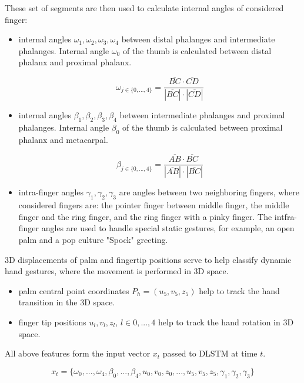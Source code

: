 These set of segments are then used to calculate internal angles of considered finger:
\begin{itemize}
    \item internal angles $\omega_1, \omega_2, \omega_3, \omega_4$ between distal phalanges and intermediate phalanges. Internal angle $\omega_0$ of the thumb is calculated between distal phalanx and proximal phalanx.
	
	\begin{equation}
		{\omega_{j \in \{0, ..., 4\}} = \frac{\overline{BC} \cdot \overline{CD}}{|\overline{BC}| \cdot |\overline{CD}|}}
	\end{equation}

    \item internal angles $\beta_1, \beta_2, \beta_3, \beta_4$ between intermediate phalanges and proximal phalanges. Internal angle $\beta_0$ of the thumb is calculated between proximal phalanx and metacarpal.
	
	\begin{equation}
		{\beta_{j \in \{0, ..., 4\}} = \frac{\overline{AB} \cdot \overline{BC}}{|\overline{AB}| \cdot |\overline{BC}|}}
	\end{equation}
	
    \item intra-finger angles $\gamma_1, \gamma_2, \gamma_3$ are angles between two neighboring fingers, where considered fingers are: the pointer finger between middle finger, the middle finger and the ring finger, and the ring finger with a pinky finger. The intfra-finger angles are used to handle special static gestures,  for example, an open palm and a pop culture "Spock" greeting.
\end{itemize}


3D displacements of palm and fingertip positions serve to help classify dynamic hand gestures, where the movement is performed in 3D space.


\begin{itemize}
	\item palm central point coordinates $P_h = (u_5, v_5, z_5)$ help to track the hand transition in the 3D space.
	\item finger tip positions $u_l, v_l, z_l$, $l \in {0, ..., 4}$ help to track the hand rotation in 3D space.
\end{itemize}

All above features form the input vector $x_t$ passed to DLSTM at time $t$.

\begin{equation}
	{x_t = \{\omega_0, ...,\omega_4, \beta_0, ..., \beta_4, u_0,v_0,z_0, ..., u_5,v_5,z_5, \gamma_1, \gamma_2, \gamma_3\}}
\end{equation}

